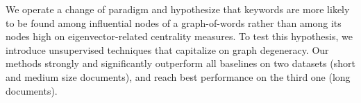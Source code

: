 We operate a change of paradigm and hypothesize that keywords are more likely to be found among influential nodes of a graph-of-words rather than among its nodes high on eigenvector-related centrality measures. To test this hypothesis, we introduce unsupervised techniques that capitalize on graph degeneracy. Our methods strongly and significantly outperform all baselines on two datasets (short and medium size documents), and reach best performance on the third one (long documents).
